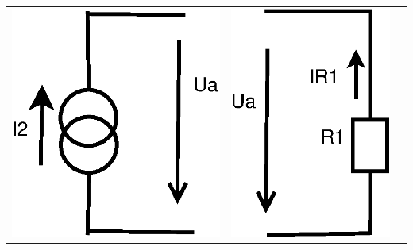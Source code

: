 \documentclass[a4paper, 12pt]{article}
\begin{document}
\begin{tabular}{|c|c|c|}
    \hline
    \includegraphics[scale=0.5]{pr3/cc_11.eps}
    & 
    \includegraphics[scale=0.5]{pr3/cc_12.eps}

\end{tabular}
\end{document}
